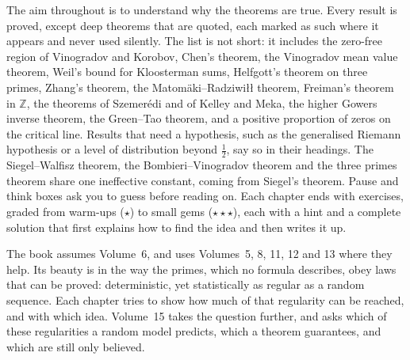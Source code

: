 The aim throughout is to understand why the theorems are true. Every result is proved, except deep theorems that are quoted, each marked as such where it appears and never used silently. The list is not short: it includes the zero-free region of Vinogradov and Korobov, Chen's theorem, the Vinogradov mean value theorem, Weil's bound for Kloosterman sums, Helfgott's theorem on three primes, Zhang's theorem, the Matom\"aki--Radziwi\l\l{} theorem, Freiman's theorem in $\mathbb Z$, the theorems of Szemer\'edi and of Kelley and Meka, the higher Gowers inverse theorem, the Green--Tao theorem, and a positive proportion of zeros on the critical line. Results that need a hypothesis, such as the generalised Riemann hypothesis or a level of distribution beyond $\frac12$, say so in their headings. The Siegel--Walfisz theorem, the Bombieri--Vinogradov theorem and the three primes theorem share one ineffective constant, coming from Siegel's theorem. Pause and think boxes ask you to guess before reading on. Each chapter ends with exercises, graded from warm-ups ($\star$) to small gems ($\star\star\star$), each with a hint and a complete solution that first explains how to find the idea and then writes it up.

The book assumes Volume~6, and uses Volumes~5, 8, 11, 12 and 13 where they help. Its beauty is in the way the primes, which no formula describes, obey laws that can be proved: deterministic, yet statistically as regular as a random sequence. Each chapter tries to show how much of that regularity can be reached, and with which idea. Volume~15 takes the question further, and asks which of these regularities a random model predicts, which a theorem guarantees, and which are still only believed.
